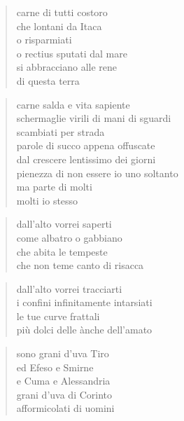 \clearpage


\vspace*{2cm}

	\begin{verse}
		carne di tutti costoro\\
		che lontani da Itaca\\
		o risparmiati\\
		o rectius sputati dal mare\\
		si abbracciano alle rene\\
		di questa terra
	\end{verse}

	\begin{verse}
		carne salda e vita sapiente\\
		schermaglie virili di mani di sguardi\\
		scambiati per strada\\
		parole di succo appena offuscate\\
		dal crescere lentissimo dei giorni\\
		pienezza di non essere io uno soltanto\\
		ma parte di molti\\
		molti io stesso
	\end{verse}

\clearpage


\vspace*{2cm}

	\begin{verse}
		dall’alto vorrei saperti\\
		come albatro o gabbiano\\
		che abita le tempeste\\
		che non teme canto di risacca
	\end{verse}

	\begin{verse}
		dall’alto vorrei tracciarti\\
		i confini infinitamente intarsiati\\
		le tue curve frattali\\
		più dolci delle ànche dell’amato
	\end{verse}

	\begin{verse}
		sono grani d’uva Tiro\\
		ed Efeso e Smirne\\
		e Cuma e Alessandria\\
		grani d’uva di Corinto\\
		afformicolati di uomini
	\end{verse}

